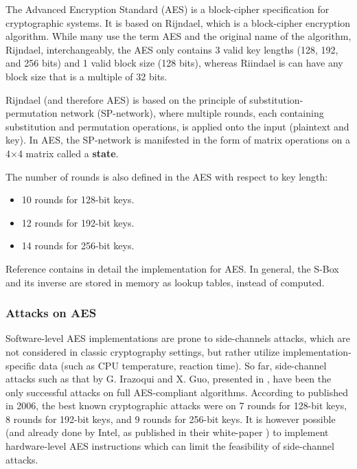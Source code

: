 \documentclass[letterpaper, twocolumn, 10pt, conference]{IEEEtran}
\newcommand{\term}[1]{\textbf{#1}}
\begin{document}
The Advanced Encryption Standard (AES) is a block-cipher specification for cryptographic systems. It is based on Rijndael, which is a block-cipher encryption algorithm\cite{daemen1999aes}. While many use the term AES and the original name of the algorithm, Rijndael, interchangeably, the AES only contains 3 valid key lengths (128, 192, and 256 bits) and 1 valid block size (128 bits), whereas Riindael is can have any block size that is a multiple of 32 bits.

Rijndael (and therefore AES) is based on the principle of substitution-permutation network (SP-network)\cite{schneier2000twofish}, where multiple rounds, each containing substitution and permutation operations, is applied onto the input (plaintext and key). In AES, the SP-network is manifested in the form of matrix operations on a 4$\times$4 matrix called a \term{state}.

The number of rounds is also defined in the AES with respect to key length:
\begin{itemize}
	\setlength\itemsep{0pt}
	\item 10 rounds for 128-bit keys.
	\item 12 rounds for 192-bit keys.
	\item 14 rounds for 256-bit keys.
\end{itemize}
Reference \cite{daemen1999aes} contains in detail the implementation for AES. In general, the S-Box and its inverse are stored in memory as lookup tables, instead of computed.

\subsubsection*{Attacks on AES}

Software-level AES implementations are prone to side-channels attacks, which are not considered in classic cryptography settings, but rather utilize implementation-specific data (such as CPU temperature, reaction time). So far, side-channel attacks such as that by G. Irazoqui and X. Guo, presented in \cite{irazoqui2017cache}, have been the only successful attacks on full AES-compliant algorithms. According to \cite{ferguson2000improved} published in 2006, the best known cryptographic attacks were on 7 rounds for 128-bit keys, 8 rounds for 192-bit keys, and 9 rounds for 256-bit keys. It is however possible (and already done by Intel, as published in their white-paper \cite{xu2010securing}) to implement hardware-level AES instructions which can limit the feasibility of side-channel attacks. 
\end{document}
